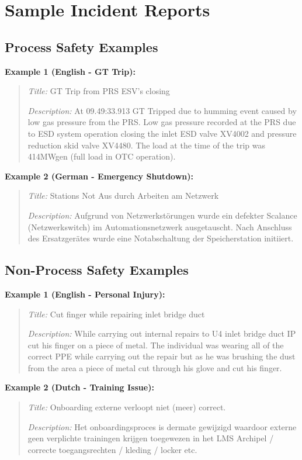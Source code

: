 \documentclass[11pt, titlepage, bibliography=totoc]{scrreprt}
\begin{document}
\section{Sample Incident Reports}

\subsection{Process Safety Examples}

\textbf{Example 1 (English - GT Trip):}
\begin{quote}
\textit{Title:} GT Trip from PRS ESV's closing

\textit{Description:} At 09.49:33.913 GT Tripped due to humming event caused by low gas pressure from the PRS. Low gas pressure recorded at the PRS due to ESD system operation closing the inlet ESD valve XV4002 and pressure reduction skid valve XV4480. The load at the time of the trip was 414MWgen (full load in OTC operation).
\end{quote}

\textbf{Example 2 (German - Emergency Shutdown):}
\begin{quote}
\textit{Title:} Stations Not Aus durch Arbeiten am Netzwerk

\textit{Description:} Aufgrund von Netzwerkstörungen wurde ein defekter Scalance (Netzwerkswitch) im Automationsnetzwerk ausgetauscht. Nach Anschluss des Ersatzgerätes wurde eine Notabschaltung der Speicherstation initiiert.
\end{quote}

\subsection{Non-Process Safety Examples}

\textbf{Example 1 (English - Personal Injury):}
\begin{quote}
\textit{Title:} Cut finger while repairing inlet bridge duct

\textit{Description:} While carrying out internal repairs to U4 inlet bridge duct IP cut his finger on a piece of metal. The individual was wearing all of the correct PPE while carrying out the repair but as he was brushing the dust from the area a piece of metal cut through his glove and cut his finger.
\end{quote}

\textbf{Example 2 (Dutch - Training Issue):}
\begin{quote}
\textit{Title:} Onboarding externe verloopt niet (meer) correct.

\textit{Description:} Het onboardingsproces is dermate gewijzigd waardoor externe geen verplichte trainingen krijgen toegewezen in het LMS Archipel / correcte toegangsrechten / kleding / locker etc.
\end{quote}
\end{document}
